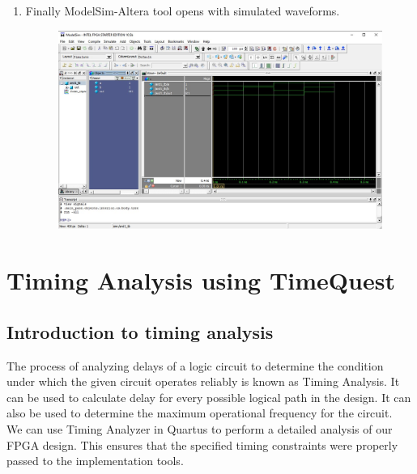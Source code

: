 \documentclass[12pt,singleside,a4paper]{article}
\begin{document}
\begin{enumerate}
    \item Finally ModelSim-Altera tool opens with simulated waveforms.
        \begin{figure}[H]
            \centering
            \includegraphics[scale=0.45]{nativelink/nativelink_waveform.jpg}
           
        \end{figure}
\end{enumerate}

\section{Timing Analysis using TimeQuest}

\subsection{Introduction to timing analysis}

\par 
The process of analyzing delays of a logic circuit to determine the condition under which the given circuit operates reliably is known as Timing Analysis.
It can be used to calculate delay for every possible logical path in the design. It can also be used to determine the maximum operational frequency for the circuit.
\\
We can use Timing Analyzer in Quartus to perform a detailed analysis of our FPGA design. This ensures that the specified timing constraints were properly passed to the implementation tools. 

\end{document}
